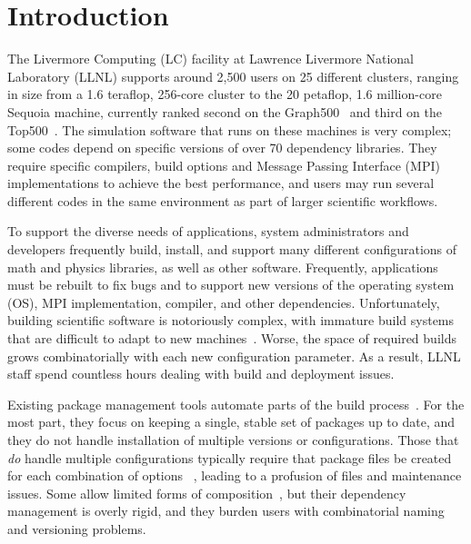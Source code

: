 
\section{Introduction}
\label{sec:intro}

The Livermore Computing (LC) facility at Lawrence Livermore National Laboratory
(LLNL) supports around 2,500 users on 25 different clusters, ranging
in size from a 1.6 teraflop, 256-core cluster to the
20 petaflop, 1.6 million-core Sequoia machine, currently ranked second on the 
Graph500~\cite{graph500} and third on the Top500~\cite{top500}.
%
%
The simulation software that runs on these machines is very complex; some
codes depend on specific versions of over 70 dependency libraries.
They require specific compilers, build options and Message Passing Interface (MPI)
implementations to
achieve the best performance, and users may run several
different codes in the same environment as part of larger
scientific workflows.

To support the diverse needs of applications, system administrators
and developers frequently build, install, and support many
different configurations of math and physics libraries, as well as
other software.  Frequently, applications must be rebuilt to fix bugs
and to support new versions of the operating system (OS), 
MPI implementation, compiler, and other
dependencies.  Unfortunately, building scientific software is
notoriously complex, with immature build systems that are difficult to
adapt to new
machines~\cite{dubois+:comp-sci-eng,hoste+:pyhpc12,wilson+:corr}.
Worse, the space of required builds grows combinatorially with each
new configuration parameter. As a result, LLNL staff spend countless
hours dealing with build and deployment issues.

Existing package management tools automate parts of the build
process~\cite{bsdports,digirolamo:smithy,dolstra+:icfp08,dolstra+:lisa04,hashdist,homebrew,hoste+:pyhpc12,macports,thiruvathukal:gentoo04}.
For the most part, they focus on keeping a single, stable set of
packages up to date, and they do not handle installation of multiple versions or
configurations.  Those that {\it do} handle multiple configurations
typically require that package files be created for each combination of
options~ \cite{digirolamo:smithy,dolstra+:icfp08,dolstra+:lisa04,hoste+:pyhpc12},
leading to a profusion of files and maintenance issues.
Some allow limited forms of 
composition~\cite{hoste+:pyhpc12,dolstra+:icfp08,dolstra+:lisa04}, but their
dependency management is overly rigid, and they burden users with
combinatorial naming and versioning problems.

